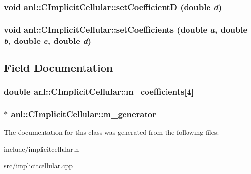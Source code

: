 \hypertarget{classanl_1_1CImplicitCellular_a6eeb2636ccb962cc1ff94f83dc53c8be}{
\subsubsection[{setCoefficientD}]{\setlength{\rightskip}{0pt plus 5cm}void anl::CImplicitCellular::setCoefficientD (double {\em d})}}
\label{classanl_1_1CImplicitCellular_a6eeb2636ccb962cc1ff94f83dc53c8be}
\hypertarget{classanl_1_1CImplicitCellular_a7e73cf42aaaa4938e9b945beddee0357}{
\subsubsection[{setCoefficients}]{\setlength{\rightskip}{0pt plus 5cm}void anl::CImplicitCellular::setCoefficients (double {\em a}, \/  double {\em b}, \/  double {\em c}, \/  double {\em d})}}
\label{classanl_1_1CImplicitCellular_a7e73cf42aaaa4938e9b945beddee0357}


\subsection{Field Documentation}
\hypertarget{classanl_1_1CImplicitCellular_a2f6d1025eb62a88ab180eeed0a32268b}{
\subsubsection[{m\_\-coefficients}]{\setlength{\rightskip}{0pt plus 5cm}double {\bf anl::CImplicitCellular::m\_\-coefficients}\mbox{[}4\mbox{]}}}
\label{classanl_1_1CImplicitCellular_a2f6d1025eb62a88ab180eeed0a32268b}
\hypertarget{classanl_1_1CImplicitCellular_a25b5b6d512c620bad24984dc9d029025}{
\subsubsection[{m\_\-generator}]{$\ast$ {\bf anl::CImplicitCellular::m\_\-generator}}}
\label{classanl_1_1CImplicitCellular_a25b5b6d512c620bad24984dc9d029025}


The documentation for this class was generated from the following files:\begin{DoxyCompactItemize}
\item 
include/\hyperlink{implicitcellular_8h}{implicitcellular.h}\item 
src/\hyperlink{implicitcellular_8cpp}{implicitcellular.cpp}\end{DoxyCompactItemize}
